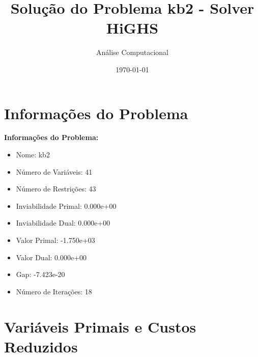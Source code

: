 \documentclass[12pt]{article}
\title{Solução do Problema kb2 - Solver HiGHS}
\author{Análise Computacional}
\date{\today}
\begin{document}
\maketitle

\section{Informações do Problema}

\textbf{Informações do Problema:}
\begin{itemize}
\item Nome: kb2
\item Número de Variáveis: 41
\item Número de Restrições: 43
\item Inviabilidade Primal: 0.000e+00
\item Inviabilidade Dual: 0.000e+00
\item Valor Primal: -1.750e+03
\item Valor Dual: 0.000e+00
\item Gap: -7.423e-20
\item Número de Iterações: 18
\end{itemize}


\section{Variáveis Primais e Custos Reduzidos}
\end{document}
